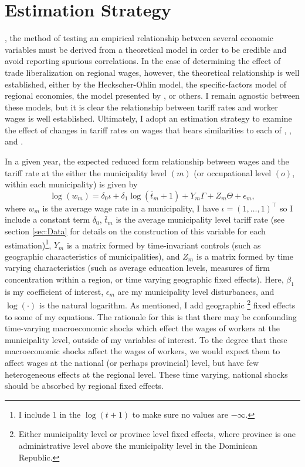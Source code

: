 \chapter{Estimation Strategy}
\label{sec:Model}

, the method of testing an empirical relationship between several economic variables must 
be derived from a theoretical model in order to be credible and avoid reporting spurious correlations.
In the case of determining the effect of trade liberalization on regional wages, however, the theoretical
relationship is well established, either by the Heckscher-Ohlin model,
the specific-factors model of regional economies, the model presented by \citeauthor{amiti}, or 
others. I remain agnostic between these models, but it is clear the relationship between tariff rates
and worker wages is well established. Ultimately, I adopt an estimation strategy to examine the 
effect of changes in tariff rates on wages that bears similarities to each of \citet{kovak}, 
\citet{amiti}, and \citet{amiti2012trade}. 

In a given year, the expected reduced form relationship between wages and the tariff rate at the either
the municipality level $(m)$ (or occupational level $(o)$, within each municipality) is given by 
\begin{equation}
\label{eq:Equation1}
\log(w_m) = \delta_0 \iota + \delta_1 \log(\bar{t}_{m}+1)+Y_m \Gamma + Z_m \Theta + \epsilon_m,
\end{equation}
where $w_m$ is the average wage rate in a municipality, 
I have $\iota = (1,\dots,1)^{\top}$ so I include a constant term $\delta_0$, 
$\bar{t}_{m}$ is the average municipality level tariff rate (see section \ref{sec:Data} for details on 
the construction of this variable for each estimation)\footnote{I include $1$ in the $\log(t+1)$
to make sure no values are $-\infty$.}, $Y_m$ is a matrix
formed by time-invariant controls (such as geographic characteristics of municipalities), and 
$Z_m$ is a matrix formed by time varying characteristics (such as average education levels, 
measures of firm concentration within a region, or time varying geographic fixed effects).
Here, $\beta_1$ is my coefficient of interest, $\epsilon_m$ are my municipality level 
disturbances, and $\log(\cdot)$ is the natural logarithm. As mentioned, I add geographic
\footnote{Either municipality level or province level fixed effects,
where province is one administrative level above the municipality level in the Dominican Republic.} 
fixed effects to some of my equations. The rationale for this is that there may be confounding 
time-varying macroeconomic shocks which effect the wages of workers at the municipality level, outside
of my variables of interest. To the degree that these macroeconomic shocks affect the
wages of workers, we would expect them to affect wages at the national (or perhaps provincial) level,
but have few heterogeneous effects at the regional level. These time varying, national shocks 
should be absorbed by regional fixed effects.

